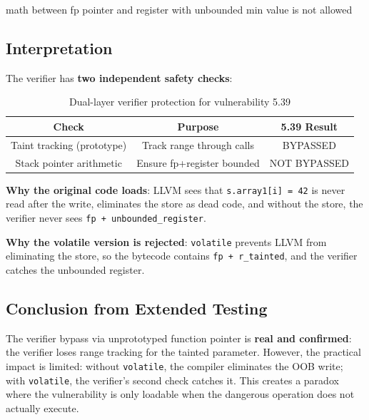 \begin{tcolorbox}[colback=gray!10, colframe=gray!10, arc=2pt, boxrule=0pt]
\small\ttfamily
math between fp pointer and register with unbounded min value is not allowed
\end{tcolorbox}

\subsection{Interpretation}

\noindent
The verifier has \textbf{two independent safety checks}:

\begin{table}[h]
\centering
\begin{tabular}{|c|c|c|}
\hline
\textbf{Check} & \textbf{Purpose} & \textbf{5.39 Result} \\
\hline
Taint tracking (prototype) & Track range through calls & BYPASSED \\
Stack pointer arithmetic & Ensure fp+register bounded & NOT BYPASSED \\
\hline
\end{tabular}
\caption{Dual-layer verifier protection for vulnerability 5.39}
\end{table}

\noindent
\textbf{Why the original code loads}: LLVM sees that \texttt{s.array1[i] = 42} is never read after the write, eliminates the store as dead code, and without the store, the verifier never sees \texttt{fp + unbounded\_register}.

\noindent
\textbf{Why the volatile version is rejected}: \texttt{volatile} prevents LLVM from eliminating the store, so the bytecode contains \texttt{fp + r\_tainted}, and the verifier catches the unbounded register.

\subsection{Conclusion from Extended Testing}

\noindent
The verifier bypass via unprototyped function pointer is \textbf{real and confirmed}: the verifier loses range tracking for the tainted parameter. However, the practical impact is limited: without \texttt{volatile}, the compiler eliminates the OOB write; with \texttt{volatile}, the verifier's second check catches it. This creates a paradox where the vulnerability is only loadable when the dangerous operation does not actually execute.

